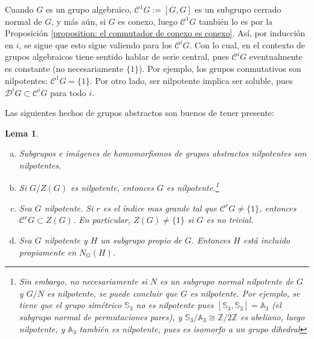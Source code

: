 \documentclass[spanish,12pt]{amsart}
\newtheorem{lemma}[theorem]{Lema}
\theoremstyle{definition}
\theoremstyle{remark}
\numberwithin{equation}{section}
\newcommand{\integers}{\mathbb{Z}}
\begin{document}
Cuando $G$ es un grupo algebraico, $\mathcal C^1 G := [G,G]$ es un subgrupo cerrado normal de $G$, y más aún, si $G$ es conexo, luego $\mathcal C^1 G$ también lo es por la Proposición \ref{proposition: el conmutador de conexo es conexo}. Así, por inducción en $i$, se sigue que esto sigue valiendo para los $\mathcal C^i G$. Con lo cual, en el contexto de grupos algebraicos tiene sentido hablar de serie central, pues $\mathcal C^i G$ eventualmente es constante (no necesariamente $\{1\}$). Por ejemplo, los grupos conmutativos son nilpotentes: $\mathcal C^1 G = \{1\}$. Por otro lado, ser nilpotente implica ser soluble, pues $\mathcal D^i G \subset \mathcal C^i G$ para todo $i$.

Las siguientes hechos de grupos abstractos son buenos de tener presente:
\begin{lemma}\label{lema:hechos generales de teoria de grupos}
\begin{enumerate}[(a)]
\item Subgrupos e imágenes de homomorfismos de grupos abstractos nilpotentes son nilpotentes.
\item Si $G/Z(G)$ es nilpotente, entonces $G$ es nilpotente.\footnote{Sin embargo, no necesariamente si $N$ es un subgrupo normal nilpotente de $G$ y $G/N$ es nilpotente, se puede concluir que $G$ es nilpotente. Por ejemplo, se tiene que el grupo simétrico $\mathbb{S}_3$ no es nilpotente pues $[\mathbb{S}_3, \mathbb{S}_3] = \mathbb A_3$ (el subgrupo normal de permutaciones pares), y $\mathbb{S}_3 / \mathbb{A}_3 \cong \integers /2 \integers$ es abeliano, luego nilpotente, y $\mathbb{A}_3$ también es nilpotente, pues es isomorfo a un grupo dihedral}
\item Sea $G$ nilpotente. Si $r$ es el índice mas grande tal que $\mathcal C^r G \neq \{1\}$, entonces $\mathcal C^r G \subset Z(G)$. En particular, $Z(G) \neq \{1\}$ si $G$ es no trivial.
\item Sea $G$ nilpotente y $H$ un subgrupo propio de $G$. Entonces $H$ está incluido propiamente en $N_G (H)$.
\end{enumerate}
\end{lemma}
\end{document}
